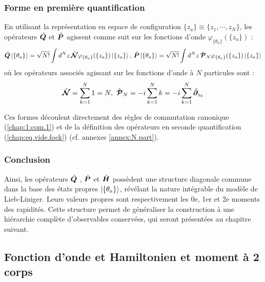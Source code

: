 \subsubsection{Forme en première quantification}
En utilisant la représentation en espace de configuration $\{z_a\} \equiv \{z_1 , \cdots , z_N \}$, les opérateurs $\hat{\bm{Q}}$ et $\hat{\bm{P}}$ agissent comme suit sur les fonctions d’onde $\varphi_{\{\theta_a\}}(\{z_a\})$ :
\begin{eqnarray}
	\hat{\bm{Q}}\ket{\{\theta_a\}} =  \sqrt{N!}\int d^Nz \, \hat{\bm{\mathcal{N}}} \varphi_{\{\theta_a\}}(\{z_a\} )\ket{\{z_a\}}, \, \hat{\bm{P}}\ket{\{\theta_a\}} =  \sqrt{N!}\int d^Nz \, \hat{\bm{\mathcal{P}}}_N \varphi_{\{\theta_a\}}(\{z_a\} )\ket{\{z_a\}} 
\end{eqnarray}
où les opérateurs associés agissant sur les fonctions d’onde à $N$ particules sont :
\begin{eqnarray}
	\hat{\bm{ \mathcal{N}}}  =  \sum_{k = 1}^N 1 = N ,~\hat{\bm{ \mathcal{P}}}_N  = -i \sum_{k = 1}^N k =- i\sum_{k = 1}^N \hat{\bm{\partial}}_{z_k}	
\end{eqnarray}

Ces formes découlent directement des règles de commutation canonique (\ref{chap:1:com.1}) et de la définition des opérateurs en seconde quantification (\ref{chap:eq.vide.fock}) (cf. annexes \ref{annex:N.part}).

\subsubsection{Conclusion}
Ainsi, les opérateurs $\hat{\bm{Q}}$ , $\hat{\bm{P}}$ et $\hat{\bm{H}}$ possèdent une structure diagonale commune dans la base des états propres $\ket{\{\theta_a\}}$, révélant la nature intégrable du modèle de Lieb-Liniger. Leurs valeurs propres sont respectivement les 0e, 1er et 2e moments des rapidités. Cette structure permet de généraliser la construction à une hiérarchie complète d’observables conservées, qui seront présentées au chapitre suivant.


\subsection{Fonction d’onde et Hamiltonien et moment à 2 corps}

